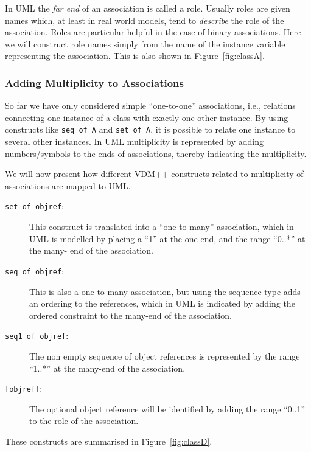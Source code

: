 \documentclass[\pformat,12pt]{article}
\newcommand{\vdmpp}{VDM++}
\begin{document}
In UML the {\it far end} of an association is called a role. Usually
roles are given names which, at least in real world models, tend to
{\em describe} the role of the association. Roles are particular
helpful in the case of binary associations. Here we will construct
role names simply from the name of the instance variable representing
the association. This is also shown in Figure~\ref{fig:classA}.

\subsubsection*{Adding Multiplicity to Associations}
  
So far we have only considered simple ``one-to-one'' associations, i.e., relations   
connecting one instance of a class with exactly one other instance.  By using constructs   
like {\tt seq of A} and {\tt set of A}, it is possible to relate one instance to several other   
instances. In UML multiplicity is represented by adding numbers/symbols to the ends of   
associations, thereby indicating the multiplicity.  

We will now present how different \vdmpp{} constructs related to multiplicity of   
associations are mapped to UML.  

\begin{description}
\item [{\tt set of objref}:]  This construct is translated into a ``one-to-many'' association, which in   
UML is modelled by placing a ``1'' at the one-end, and the range ``0..*'' at the many-  
end of the association.  
\item [{\tt seq of objref}:]  This is also a one-to-many association, but using the sequence type adds   
an ordering to the references, which in UML is indicated by adding the {ordered}   
constraint to the many-end of the association.  
\item [{\tt seq1 of objref}:]  The non empty sequence of object references is represented by the   
range ``1..*'' at the many-end of the association.  
\item [{\tt [objref]}:]  The optional object reference will be identified by adding the range ``0..1'' to   
the role of the association.  
\end{description}

These constructs are summarised in Figure~\ref{fig:classD}. 
\end{document}
